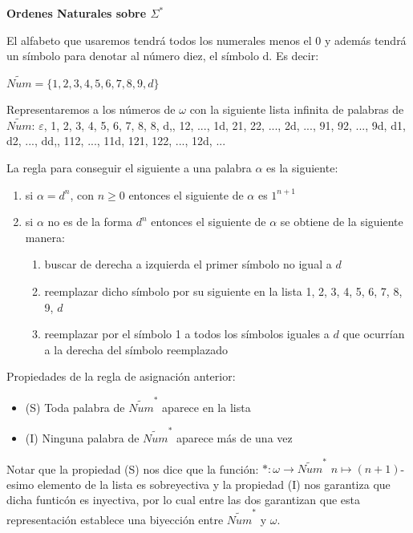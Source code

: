 \documentclass{article}
\begin{document}
\begin{flushleft}
\begin{Large}\textbf{Ordenes Naturales sobre $\Sigma^*$}\end{Large}\linebreak

El alfabeto que usaremos tendrá todos los numerales menos el 0 y además tendrá un símbolo para denotar al número diez, el símbolo d. Es decir:
\begin{center}
    $\widetilde{Num} = \{1, 2, 3, 4, 5, 6, 7, 8, 9, d\}$
\end{center}
Representaremos a los números de $\omega$ con la siguiente lista infinita de palabras de $\widetilde{Num}$:\linebreak
$\varepsilon$, 1, 2, 3, 4, 5, 6, 7, 8, 8, d,, 12, ..., 1d, 21, 22, ..., 2d, ..., 91, 92, ..., 9d, d1, d2, ..., dd,, 112, ..., 11d, 121, 122, ..., 12d, ...\linebreak

La regla para conseguir el siguiente a una palabra $\alpha$ es la siguiente:
\begin{enumerate}
    \item si $\alpha = d^n$, con $n \geq 0$ entonces el siguiente de $\alpha$ es $1^{n+1}$
    \item si $\alpha$ no es de la forma $d^n$ entonces el siguiente de $\alpha$ se obtiene de la siguiente manera:
    \begin{enumerate}
        \item buscar de derecha a izquierda el primer símbolo no igual a $d$
        \item reemplazar dicho símbolo por su siguiente en la lista 1, 2, 3, 4, 5, 6, 7, 8, 9, $d$
        \item reemplazar por el símbolo 1 a todos los símbolos iguales a $d$ que ocurrían a la derecha del símbolo reemplazado
    \end{enumerate}
\end{enumerate}

Propiedades de la regla de asignación anterior:
\begin{itemize}
    \item (S) Toda palabra de $\widetilde{Num}^*$ aparece en la lista
    \item (I) Ninguna palabra de $\widetilde{Num}^*$ aparece más de una vez
\end{itemize}

Notar que la propiedad (S) nos dice que la función:
\hspace*{30ex} $*: \omega \rightarrow \widetilde{Num}^*$\linebreak
\hspace*{34ex}$n \mapsto (n+1)$-esimo elemento de la lista\linebreak
es sobreyectiva y la propiedad (I) nos garantiza que dicha funticón es inyectiva, por lo cual entre las dos garantizan que esta representación establece una biyección entre $\widetilde{Num}^*$ y $\omega$.\linebreak


\end{flushleft}
\end{document}
